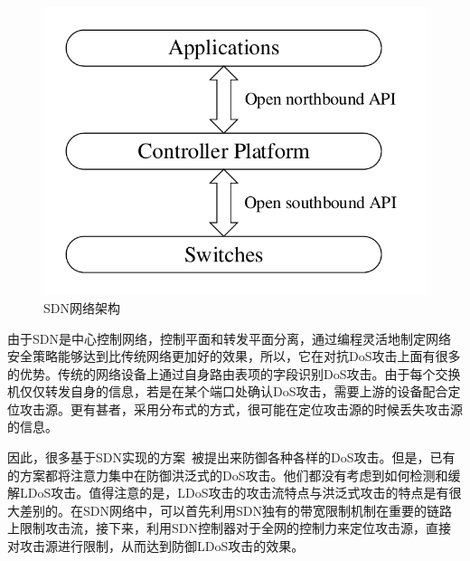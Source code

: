 \begin{figure}
    \centering
    \includegraphics[scale=0.5]{figures/SDN-network}
    \caption{SDN网络架构}
    \label{fig:sdnfig}
\end{figure}

由于SDN是中心控制网络，控制平面和转发平面分离，通过编程灵活地制定网络安全策略能够达到比传统网络更加好的效果，所以，它在对抗DoS攻击上面有很多的优势。传统的网络设备上通过自身路由表项的字段识别DoS攻击。由于每个交换机仅仅转发自身的信息，若是在某个端口处确认DoS攻击，需要上游的设备配合定位攻击源。更有甚者，采用分布式的方式，很可能在定位攻击源的时候丢失攻击源的信息。

因此，很多基于SDN实现的方案~\cite{b9, b16, b11, b23, b24}被提出来防御各种各样的DoS攻击。但是，已有的方案都将注意力集中在防御洪泛式的DoS攻击。他们都没有考虑到如何检测和缓解LDoS攻击。值得注意的是，LDoS攻击的攻击流特点与洪泛式攻击的特点是有很大差别的。在SDN网络中，可以首先利用SDN独有的带宽限制机制在重要的链路上限制攻击流，接下来，利用SDN控制器对于全网的控制力来定位攻击源，直接对攻击源进行限制，从而达到防御LDoS攻击的效果。


